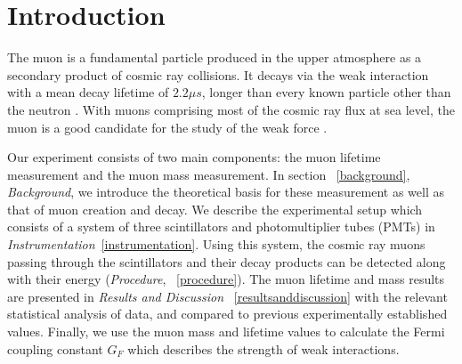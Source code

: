 
\section{Introduction}\label{introduction}

The muon is a fundamental particle produced in the upper atmosphere as
a secondary product of cosmic ray collisions. It decays via the weak
interaction with a mean decay lifetime of $2.2 \mu s$, longer than
every known particle other than the neutron \cite{pdg}. With muons
comprising most of the cosmic ray flux at sea level, the muon is a
good candidate for the study of the weak force \cite[p.~8]{rossi}.

Our experiment consists of two main components: the muon lifetime
measurement and the muon mass measurement. In section
~\ref{background}, \emph{Background}, we introduce the theoretical
basis for these measurement as well as that of muon creation and
decay. We describe the experimental setup which consists of a system
of three scintillators and photomultiplier tubes (PMTs) in
\emph{Instrumentation}~\ref{instrumentation}. Using this system, the
cosmic ray muons passing through the scintillators and their decay
products can be detected along with their energy (\emph{Procedure},
~\ref{procedure}). The muon lifetime and mass results are presented in
\emph{Results and Discussion} ~\ref{resultsanddiscussion} with the
relevant statistical analysis of data, and compared to previous
experimentally established values. Finally, we use the muon mass and
lifetime values to calculate the Fermi coupling constant $G_F$ which
describes the strength of weak interactions.
